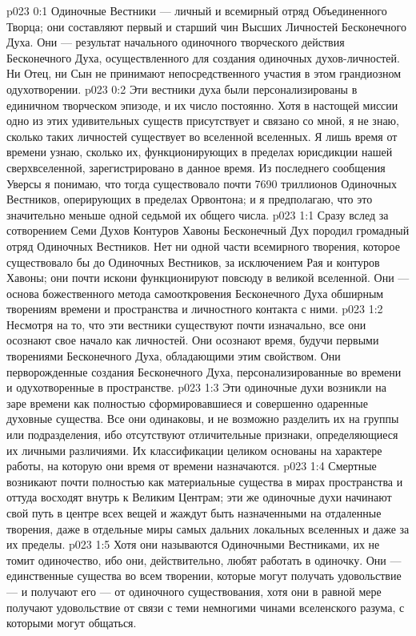 \vs p023 0:1 Одиночные Вестники --- личный и всемирный отряд Объединенного Творца; они составляют первый и старший чин Высших Личностей Бесконечного Духа. Они --- результат начального одиночного творческого действия Бесконечного Духа, осуществленного для создания одиночных духов\hyp{}личностей. Ни Отец, ни Сын не принимают непосредственного участия в этом грандиозном одухотворении.
\vs p023 0:2 Эти вестники духа были персонализированы в единичном творческом эпизоде, и их число постоянно. Хотя в настощей миссии одно из этих удивительных существ присутствует и связано со мной, я не знаю, сколько таких личностей существует во вселенной вселенных. Я лишь время от времени узнаю, сколько их, функционирующих в пределах юрисдикции нашей сверхвселенной, зарегистрировано в данное время. Из последнего сообщения Уверсы я понимаю, что тогда существовало почти 7690 триллионов Одиночных Вестников, оперирующих в пределах Орвонтона; и я предполагаю, что это значительно меньше одной седьмой их общего числа.
\vs p023 1:1 Сразу вслед за сотворением Семи Духов Контуров Хавоны Бесконечный Дух породил громадный отряд Одиночных Вестников. Нет ни одной части всемирного творения, которое существовало бы до Одиночных Вестников, за исключением Рая и контуров Хавоны; они почти искони функционируют повсюду в великой вселенной. Они --- основа божественного метода самооткровения Бесконечного Духа обширным творениям времени и пространства и личностного контакта с ними.
\vs p023 1:2 Несмотря на то, что эти вестники существуют почти изначально, все они осознают свое начало как личностей. Они осознают время, будучи первыми творениями Бесконечного Духа, обладающими этим свойством. Они перворожденные создания Бесконечного Духа, персонализированные во времени и одухотворенные в пространстве.
\vs p023 1:3 Эти одиночные духи возникли на заре времени как полностью сформировавшиеся и совершенно одаренные духовные существа. Все они одинаковы, и не возможно разделить их на группы или подразделения, ибо отсутствуют отличительные признаки, определяющиеся их личными различиями. Их классификации целиком основаны на характере работы, на которую они время от времени назначаются.
\vs p023 1:4 Смертные возникают почти полностью как материальные существа в мирах пространства и оттуда восходят внутрь к Великим Центрам; эти же одиночные духи начинают свой путь в центре всех вещей и жаждут быть назначенными на отдаленные творения, даже в отдельные миры самых дальних локальных вселенных и даже за их пределы.
\vs p023 1:5 Хотя они называются Одиночными Вестниками, их не томит одиночество, ибо они, действительно, любят работать в одиночку. Они --- единственные существа во всем творении, которые могут получать удовольствие --- и получают его --- от одиночного существования, хотя они в равной мере получают удовольствие от связи с теми немногими чинами вселенского разума, с которыми могут общаться.
